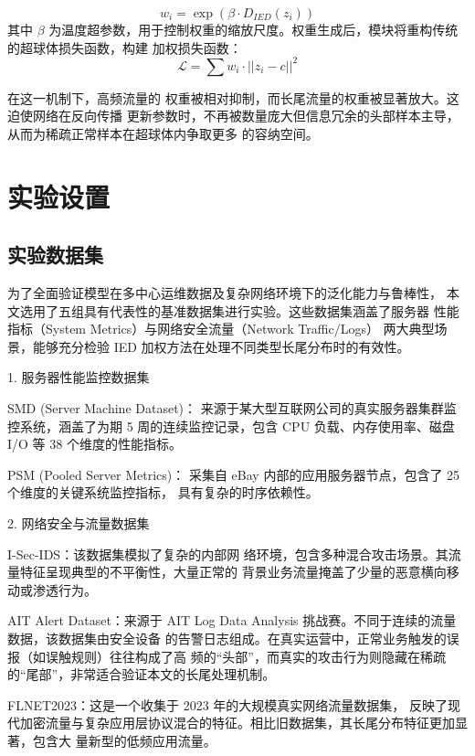  \begin{equation}
 w_i=\exp(\beta\cdot D_{IED}(z_i))
 \end{equation}
 其中 $\beta$ 为温度超参数，用于控制权重的缩放尺度。权重生成后，模块将重构传统的超球体损失函数，构建
 加权损失函数：
 \begin{equation}
 \mathcal{L}=\sum w_i\cdot||z_i-c||^2
 \end{equation}

 在这一机制下，高频流量的
 权重被相对抑制，而长尾流量的权重被显著放大。这迫使网络在反向传播
 更新参数时，不再被数量庞大但信息冗余的头部样本主导，从而为稀疏正常样本在超球体内争取更多
 的容纳空间。


\section{实验设置}

\subsection{实验数据集}
为了全面验证模型在多中心运维数据及复杂网络环境下的泛化能力与鲁棒性，
本文选用了五组具有代表性的基准数据集进行实验。这些数据集涵盖了服务器
性能指标（System Metrics）与网络安全流量（Network Traffic/Logs）
两大典型场景，能够充分检验 IED 加权方法在处理不同类型长尾分布时的有效性。

1. 服务器性能监控数据集

SMD (Server Machine Dataset)\cite{su2019robust}：
来源于某大型互联网公司的真实服务器集群监控系统，涵盖了为期 5 
周的连续监控记录，包含 CPU 负载、内存使用率、磁盘 I/O 等 38 
个维度的性能指标。

PSM (Pooled Server Metrics)\cite{abdulaal2021practical}：
采集自 eBay 内部的应用服务器节点，包含了 25 个维度的关键系统监控指标，
具有复杂的时序依赖性。

2. 网络安全与流量数据集

I-Sec-IDS\cite{serinelli2023toward}：该数据集模拟了复杂的内部网
络环境，包含多种混合攻击场景。其流量特征呈现典型的不平衡性，大量正常的
背景业务流量掩盖了少量的恶意横向移动或渗透行为。

AIT Alert Dataset\cite{landauer2024introducing}：来源于 
AIT Log Data Analysis 挑战赛。不同于连续的流量数据，该数据集由安全设备
的告警日志组成。在真实运营中，正常业务触发的误报（如误触规则）往往构成了高
频的“头部”，而真实的攻击行为则隐藏在稀疏的“尾部”，非常适合验证本文的长尾处理机制。

FLNET2023\cite{tayeen2023flnet}：这是一个收集于 2023 年的大规模真实网络流量数据集，
反映了现代加密流量与复杂应用层协议混合的特征。相比旧数据集，其长尾分布特征更加显著，包含大
量新型的低频应用流量。


